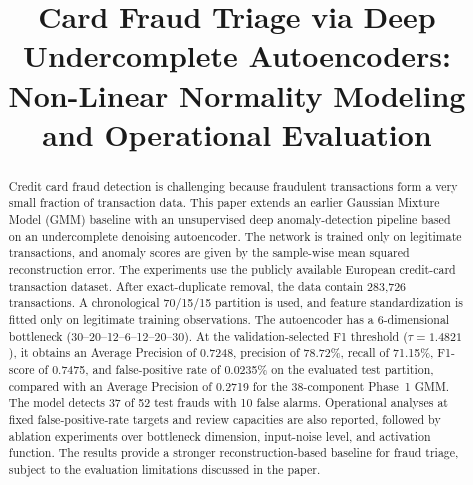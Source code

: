 \documentclass[conference]{IEEEtran}
\begin{document}
\title{Card Fraud Triage via Deep Undercomplete Autoencoders: Non-Linear Normality Modeling and Operational Evaluation}

\author{
}

\maketitle

\begin{abstract}
Credit card fraud detection is challenging because fraudulent transactions form a very small fraction of transaction data. This paper extends an earlier Gaussian Mixture Model (GMM) baseline with an unsupervised deep anomaly-detection pipeline based on an undercomplete denoising autoencoder. The network is trained only on legitimate transactions, and anomaly scores are given by the sample-wise mean squared reconstruction error. The experiments use the publicly available European credit-card transaction dataset. After exact-duplicate removal, the data contain 283,726 transactions. A chronological 70/15/15 partition is used, and feature standardization is fitted only on legitimate training observations. The autoencoder has a 6-dimensional bottleneck (30--20--12--6--12--20--30). At the validation-selected F1 threshold ($\tau=1.4821$), it obtains an Average Precision of 0.7248, precision of 78.72\%, recall of 71.15\%, F1-score of 0.7475, and false-positive rate of 0.0235\% on the evaluated test partition, compared with an Average Precision of 0.2719 for the 38-component Phase~1 GMM. The model detects 37 of 52 test frauds with 10 false alarms. Operational analyses at fixed false-positive-rate targets and review capacities are also reported, followed by ablation experiments over bottleneck dimension, input-noise level, and activation function. The results provide a stronger reconstruction-based baseline for fraud triage, subject to the evaluation limitations discussed in the paper.
\end{abstract}
\end{document}
